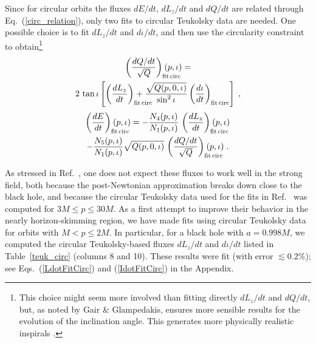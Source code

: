 \documentclass[aps,prd,twocolumn,showpacs,groupedaddress,nofootinbib]{revtex4}
\begin{document}
Since for circular orbits the fluxes $dE/dt$, $dL_z/dt$ and $dQ/dt$
are related through Eq.\ (\ref{circ_relation}), only two fits to
circular Teukolsky data are needed.  One possible choice is to fit
$dL_z/dt$ and $d\iota/dt$, and then use the circularity constraint to
obtain\footnote{This choice might seem more involved than fitting
directly $dL_z/dt$ and $dQ/dt$, but, as noted by Gair \& Glampedakis,
ensures more sensible results for the evolution of the inclination
angle.  This generates more physically realistic inspirals
{\cite{GG_kludge_fluxes}}.}  {\cite{GG_kludge_fluxes}}
\begin{multline}
\left(\frac{dQ/dt}{\sqrt{Q}}
\right)_{\rm fit\, circ}\hskip-0.75cm(p,\iota)=\\2\,\tan\iota\left[\left(\frac{dL_z}{dt}\right)_{\rm fit\,circ}\hskip-0.75cm 
+\frac{\sqrt{Q(p,0,\iota)}}{\sin^2\iota}\left(\frac{d\iota}{dt}\right)_{\rm fit\,circ}\right]\;,
\end{multline}
\begin{multline}
  \left(\frac{dE}{dt}\right)_{\rm fit\, circ}\hskip-0.75cm
  (p,\iota)=-\frac{N_{4}(p,\iota)}{N_{1}(p,\iota)}\,\left(\frac{dL_z}{dt}\right)_{\rm
    fit\, circ}\hskip-0.75cm (p,\iota)\\-
  \frac{N_{5}(p,\iota)}{N_{1}(p,\iota)}\sqrt{Q(p,0,\iota)}\,\left(\frac{dQ/dt}{\sqrt{Q}}
  \right)_{\rm fit\, circ}\hskip-0.75cm (p,\iota)\;.
\end{multline}


As stressed in Ref.~\cite{GG_kludge_fluxes}, one does not expect these
fluxes to work well in the strong field, both because the
post-Newtonian approximation breaks down close to the black hole, and
because the circular Teukolsky data used for the fits in Ref.\
{\cite{GG_kludge_fluxes}} was computed for $3M \le p \le 30M$.  As a
first attempt to improve their behavior in the nearly horizon-skimming
region, we have made fits using circular Teukolsky data for orbits
with $M < p \leq 2M$.  In particular, for a black hole with $a =
0.998M$, we computed the circular Teukolsky-based fluxes $dL_z/dt$ and
$d\iota/dt$ listed in Table~\ref{teuk_circ} (columns 8 and 10).  These
results were fit (with error $\lesssim 0.2$\%); see Eqs.\
(\ref{LdotFitCirc}) and (\ref{IdotFitCirc}) in the Appendix.
\end{document}
